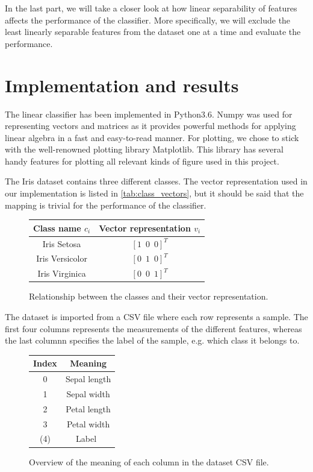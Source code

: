 \documentclass{article}
\begin{document}
In the last part, we will take a closer look at how linear separability of features
affects the performance of the classifier. More specifically, we will exclude the
least linearly separable features from the dataset one at a time and evaluate the
performance.

\section{Implementation and results}\label{sec:implementation_and_results}

The linear classifier has been implemented in Python3.6. Numpy was used for
representing vectors and matrices as it provides powerful methods for applying
linear algebra in a fast and easy-to-read manner. For plotting, we chose to stick
with the well-renowned plotting library Matplotlib. This library has several
handy features for plotting all relevant kinds of figure used in this project.

The Iris dataset contains three different classes. The vector representation used
in our implementation is listed in \autoref{tab:class_vectors}, but it should be
said that the mapping is trivial for the performance of the classifier.

\begin{figure}
    \centering
    \begin{tabular}{ | c | c | }
        \hline
        Class name $c_i$ & Vector representation $v_i$ \\
        \hline
        Iris Setosa & $[1 \enspace 0 \enspace 0]^T$ \\
        Iris Versicolor & $[0 \enspace 1 \enspace 0]^T$ \\
        Iris Virginica & $[0 \enspace 0 \enspace 1]^T$ \\
        \hline
    \end{tabular}
    \caption{Relationship between the classes and their vector representation.}
    \label{tab:class_vectors}
\end{figure}

The dataset is imported from a CSV file where each row represents a sample. The first four columns
represents the measurements of the different features, whereas the last columnn specifies the label of
the sample, e.g. which class it belongs to.

\begin{figure}
    \centering
    \begin{tabular}{ | c | c | }
        \hline
        Index & Meaning \\
        \hline
        0 & Sepal length \\
        1 & Sepal width \\
        2 & Petal length \\
        3 & Petal width \\
        (4) & Label \\
        \hline
    \end{tabular}
    \caption{Overview of the meaning of each column in the dataset CSV file.}
    \label{tab:class_vectors}
\end{figure}
\end{document}
